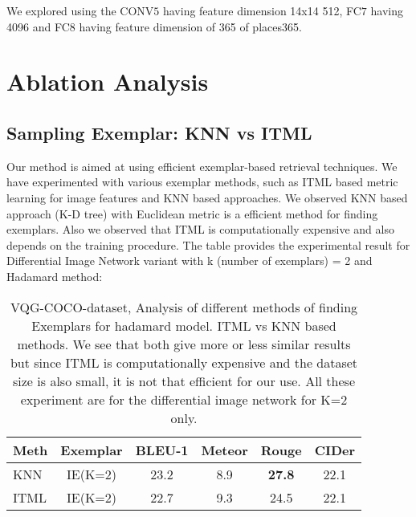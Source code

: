 \documentclass[11pt,a4paper]{article}
\begin{document}
We explored using the CONV$5$ having feature dimension 14x14 512, FC$7$ having 4096 and FC8 having feature dimension of 365 of places365.



\section{Ablation Analysis}\label{disc}
\subsection{Sampling Exemplar: KNN vs ITML}
Our method is aimed at using efficient exemplar-based retrieval techniques. 
We have experimented with various exemplar methods, such as  ITML \cite{davis_ACM2007} based metric learning for image features and KNN based approaches. We observed KNN based approach (K-D tree) with Euclidean metric is a efficient method for finding exemplars. Also we observed that ITML is computationally expensive and also depends on the training procedure. The table provides the experimental result for Differential Image Network variant with k (number of exemplars) = 2  and Hadamard method:	

 \begin{table}[h!]
\scriptsize
\centering
\begin{tabular}{|l|c|cccc|}
\hline \bf Meth & \bf Exemplar & \bf BLEU-1 & \bf Meteor & \bf Rouge  & \bf CIDer \\ \hline
KNN &IE(K=2)& 23.2 &8.9 & \textbf{27.8} & 22.1\\ 
ITML &IE(K=2)& 22.7 &9.3 & 24.5 & 22.1\\ \hline
\end{tabular}
\caption{\label{score_tab_11a}VQG-COCO-dataset, Analysis of different methods of finding Exemplars for hadamard model. ITML vs KNN based methods. We see that both give more or less similar results but since ITML is computationally expensive and the dataset size is also small, it is not that efficient for our use. All these experiment are for the differential image network for K=2 only.}
\end{table}
\end{document}

